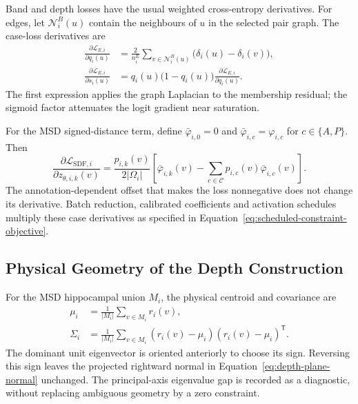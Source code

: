 \documentclass[12pt,a4paper]{article}
\begin{document}
Band and depth losses have the usual weighted cross-entropy derivatives.
For edges, let $\mathcal N_i^B(u)$ contain the neighbours of $u$ in
the selected pair graph. The case-loss derivatives are
\begin{equation}
\begin{aligned}
\frac{\partial\mathcal{L}_{E,i}}{\partial q_i(u)}
 &=\frac{2}{n_i^E}\sum_{v\in\mathcal{N}_i^B(u)}
       \bigl(\delta_i(u)-\delta_i(v)\bigr),\\
\frac{\partial\mathcal{L}_{E,i}}{\partial s_i(u)}
 &=q_i(u)\bigl(1-q_i(u)\bigr)
   \frac{\partial\mathcal{L}_{E,i}}{\partial q_i(u)}.
\end{aligned}
\label{eq:edge-logit-gradient}
\end{equation}
The first expression applies the graph Laplacian to the membership
residual; the sigmoid factor attenuates the logit gradient near saturation.

For the MSD signed-distance term, define $\bar\varphi_{i,0}=0$ and
$\bar\varphi_{i,c}=\varphi_{i,c}$ for $c\in\{A,P\}$. Then
\begin{equation}
\frac{\partial\mathcal{L}_{\mathrm{SDF},i}}
     {\partial z_{\theta,i,k}(v)}
=\frac{p_{i,k}(v)}{2|\Omega_i|}
 \left[\bar\varphi_{i,k}(v)
       -\sum_{c\in\mathcal{C}}p_{i,c}(v)\bar\varphi_{i,c}(v)\right].
\label{eq:sdf-logit-gradient}
\end{equation}
The annotation-dependent offset that makes the loss nonnegative does
not change its derivative. Batch reduction, calibrated coefficients and
activation schedules multiply these case derivatives as specified in
Equation~\ref{eq:scheduled-constraint-objective}.

\subsection{Physical Geometry of the Depth Construction}

For the MSD hippocampal union $M_i$, the physical centroid and covariance are
\begin{equation}
\begin{aligned}
\mu_i&=\frac{1}{|M_i|}\sum_{v\in M_i}r_i(v),\\
\Sigma_i&=\frac{1}{|M_i|}\sum_{v\in M_i}
       (r_i(v)-\mu_i)(r_i(v)-\mu_i)^{\mathsf T}.
\end{aligned}
\label{eq:depth-centroid-covariance}
\end{equation}
The dominant unit eigenvector is oriented anteriorly to choose its
sign. Reversing this sign leaves the projected rightward normal in
Equation~\ref{eq:depth-plane-normal} unchanged. The principal-axis
eigenvalue gap is recorded as a diagnostic, without replacing
ambiguous geometry by a zero constraint.
\end{document}
